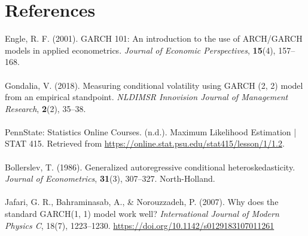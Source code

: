 \documentclass{article}
\begin{document}
\section{References}
\begin{itemize}
\noindent
Engle, R. F. (2001). GARCH 101: An introduction to the use of ARCH/GARCH models in applied econometrics. \textit{Journal of Economic Perspectives}, \textbf{15}(4), 157–168.\\
\\
\noindent
Gondalia, V. (2018). Measuring conditional volatility using GARCH (2, 2) model from an empirical standpoint. \textit{NLDIMSR Innovision Journal of Management Research}, \textbf{2}(2), 35–38.\\
\\
\noindent
PennState: Statistics Online Courses. (n.d.). Maximum Likelihood Estimation | STAT 415. Retrieved from \url{https://online.stat.psu.edu/stat415/lesson/1/1.2}.\\
\\
\noindent
Bollerslev, T. (1986). Generalized autoregressive conditional heteroskedasticity. \textit{Journal of Econometrics}, \textbf{31}(3), 307–327. North-Holland.\\
\noindent
\\
Jafari, G. R., Bahraminasab, A., \& Norouzzadeh, P. (2007). Why does the standard GARCH(1, 1) model work well? \textit{International Journal of Modern Physics C}, 18(7), 1223–1230. \url{https://doi.org/10.1142/s0129183107011261}
\end{itemize}
\\
\end{document}
